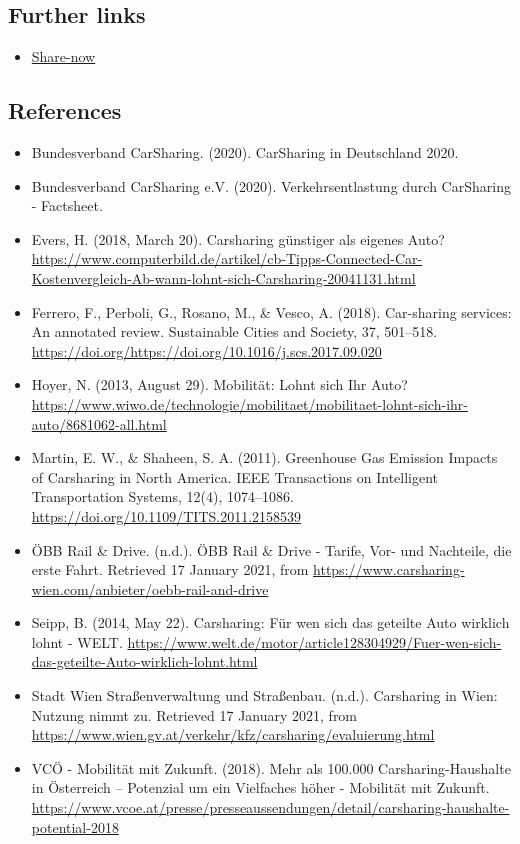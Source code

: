 \documentclass[
]{book}
\providecommand{\tightlist}{%
  \setlength{\itemsep}{0pt}\setlength{\parskip}{0pt}}
\begin{document}
\hypertarget{further-links-26}{%
\subsection*{Further links}\label{further-links-26}}

\begin{itemize}
\tightlist
\item
  \href{https://www.share-now.com/at/en/faq/}{Share-now}
\end{itemize}

\hypertarget{references-31}{%
\subsection*{References}\label{references-31}}

\begin{itemize}
\tightlist
\item
  Bundesverband CarSharing. (2020). CarSharing in Deutschland 2020.
\item
  Bundesverband CarSharing e.V. (2020). Verkehrsentlastung durch CarSharing - Factsheet.
\item
  Evers, H. (2018, March 20). Carsharing günstiger als eigenes Auto? \url{https://www.computerbild.de/artikel/cb-Tipps-Connected-Car-Kostenvergleich-Ab-wann-lohnt-sich-Carsharing-20041131.html}
\item
  Ferrero, F., Perboli, G., Rosano, M., \& Vesco, A. (2018). Car-sharing services: An annotated review. Sustainable Cities and Society, 37, 501--518. \url{https://doi.org/https://doi.org/10.1016/j.scs.2017.09.020}
\item
  Hoyer, N. (2013, August 29). Mobilität: Lohnt sich Ihr Auto? \url{https://www.wiwo.de/technologie/mobilitaet/mobilitaet-lohnt-sich-ihr-auto/8681062-all.html}
\item
  Martin, E. W., \& Shaheen, S. A. (2011). Greenhouse Gas Emission Impacts of Carsharing in North America. IEEE Transactions on Intelligent Transportation Systems, 12(4), 1074--1086. \url{https://doi.org/10.1109/TITS.2011.2158539}
\item
  ÖBB Rail \& Drive. (n.d.). ÖBB Rail \& Drive - Tarife, Vor- und Nachteile, die erste Fahrt. Retrieved 17 January 2021, from \url{https://www.carsharing-wien.com/anbieter/oebb-rail-and-drive}
\item
  Seipp, B. (2014, May 22). Carsharing: Für wen sich das geteilte Auto wirklich lohnt - WELT. \url{https://www.welt.de/motor/article128304929/Fuer-wen-sich-das-geteilte-Auto-wirklich-lohnt.html}
\item
  Stadt Wien \textbar{} Straßenverwaltung und Straßenbau. (n.d.). Carsharing in Wien: Nutzung nimmt zu. Retrieved 17 January 2021, from \url{https://www.wien.gv.at/verkehr/kfz/carsharing/evaluierung.html}
\item
  VCÖ - Mobilität mit Zukunft. (2018). Mehr als 100.000 Carsharing-Haushalte in Österreich -- Potenzial um ein Vielfaches höher - Mobilität mit Zukunft. \url{https://www.vcoe.at/presse/presseaussendungen/detail/carsharing-haushalte-potential-2018}
\end{itemize}
\end{document}
